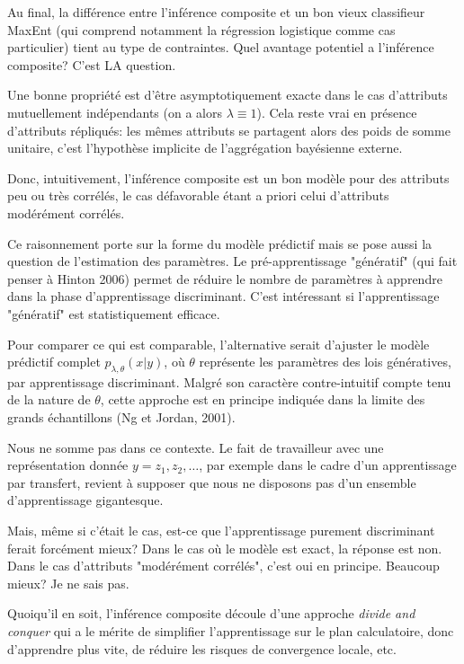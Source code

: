 \documentclass{article}
\begin{document}
Au final, la diff\'erence entre l'inf\'erence composite et un bon vieux classifieur MaxEnt (qui comprend notamment la r\'egression logistique comme cas particulier) tient au type de contraintes. Quel avantage potentiel a l'inf\'erence composite? C'est LA question.

Une bonne propri\'et\'e est d'\^etre asymptotiquement exacte dans le cas d'attributs mutuellement ind\'ependants (on a alors $\lambda\equiv 1$). Cela reste vrai en pr\'esence d'attributs r\'epliqu\'es:  les m\^emes attributs se partagent alors des poids de somme unitaire, c'est l'hypoth\`ese implicite de l'aggr\'egation bay\'esienne externe. 

Donc, intuitivement, l'inf\'erence composite est un bon mod\`ele pour des attributs peu ou tr\`es corr\'el\'es, le cas d\'efavorable \'etant a priori celui d'attributs mod\'er\'ement corr\'el\'es.

Ce raisonnement porte sur la forme du mod\`ele pr\'edictif mais se pose aussi la question de l'estimation des param\`etres. Le pr\'e-apprentissage "g\'en\'eratif" (qui fait penser \`a Hinton 2006) permet de r\'eduire le nombre de param\`etres \`a apprendre dans la phase d'apprentissage discriminant. C'est int\'eressant si l'apprentissage "g\'en\'eratif" est statistiquement efficace.

Pour comparer ce qui est comparable, l'alternative serait d'ajuster le mod\`ele pr\'edictif complet $p_{\lambda,\theta}(x|y)$, o\`u $\theta$ repr\'esente les param\`etres des lois g\'en\'eratives, par apprentissage discriminant. Malgr\'e son caract\`ere contre-intuitif compte tenu de la nature de $\theta$, cette approche est en principe indiqu\'ee dans la limite des grands \'echantillons (Ng et Jordan, 2001). 

Nous ne somme pas dans ce contexte. Le fait de travailleur avec une repr\'esentation donn\'ee $y=z_1,z_2,\ldots$, par exemple dans le cadre d'un apprentissage par transfert, revient \`a supposer que nous ne disposons pas d'un ensemble d'apprentissage gigantesque. 

Mais, m\^eme si c'\'etait le cas, est-ce que l'apprentissage purement discriminant ferait forc\'ement mieux? Dans le cas o\`u le mod\`ele est exact, la r\'eponse est non. Dans le cas d'attributs "mod\'er\'ement corr\'el\'es", c'est oui en principe. Beaucoup mieux? Je ne sais pas.

Quoiqu'il en soit, l'inf\'erence composite d\'ecoule d'une approche {\em divide and conquer} qui a le m\'erite de simplifier l'apprentissage sur le plan calculatoire, donc d'apprendre plus vite, de r\'eduire les risques de convergence locale, etc.
\end{document}
